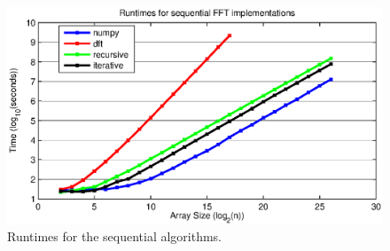 \begin{figure}[h!]
\centering
\includegraphics[scale=0.9]{img/seqRuntimes.eps}
\caption{Runtimes for the sequential algorithms.}
\label{seqTimes}
\end{figure}
\pagebreak